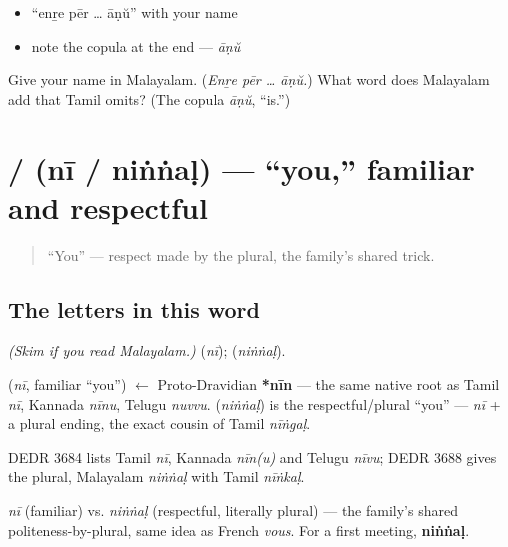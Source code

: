 \begin{itemize}
\raggedright
  \item \textquotedblleft{}enṟe pēr … āṇŭ\textquotedblright{} with your name
  \item note the copula at the end — \emph{āṇŭ}
\end{itemize}

\begin{tcolorbox}[breakable,colback=teal!4,colframe=teal!35!black,title={Before you move on}]
Give your name in Malayalam. (\emph{Enṟe pēr … āṇŭ.}) What word does Malayalam add that Tamil omits? (The copula \emph{āṇŭ}, \textquotedblleft{}is.\textquotedblright{})
\end{tcolorbox}
\section[\texorpdfstring{\ml{നീ} / \ml{നിങ്ങൾ} (nī / niṅṅaḷ)}{നീ / നിങ്ങൾ (nī / niṅṅaḷ)}]{ /  (nī / niṅṅaḷ) — \textquotedblleft{}you,\textquotedblright{} familiar and respectful}

\label{lesson:ML-C02-nii-ningal}



\begin{quote}
\textquotedblleft{}You\textquotedblright{} — respect made by the plural, the family's shared trick.
\end{quote}

\subsection*{The letters in this word}
\emph{(Skim if you read Malayalam.)} \textbf{} (\emph{nī}); \textbf{} (\emph{niṅṅaḷ}).

\begin{cousinweb}
\textbf{} (\emph{nī}, familiar \textquotedblleft{}you\textquotedblright{}) $\leftarrow$ Proto-Dravidian \textbf{*nīn} — the same native root as Tamil \emph{nī}, Kannada \emph{nīnu}, Telugu \emph{nuvvu}. \textbf{} (\emph{niṅṅaḷ}) is the respectful/plural \textquotedblleft{}you\textquotedblright{} — \emph{nī} + a plural ending, the exact cousin of Tamil \emph{nīṅgaḷ}.

DEDR 3684 lists Tamil \emph{nī}, Kannada \emph{nīn(u)} and Telugu \emph{nīvu}; DEDR 3688 gives the plural, Malayalam \emph{niṅṅaḷ} with Tamil \emph{nīṅkaḷ}.
\end{cousinweb}

\begin{grammarlens}[title={Grammar Lens: respect by the plural}]
\emph{nī} (familiar) vs. \emph{niṅṅaḷ} (respectful, literally plural) — the family's shared politeness-by-plural, same idea as French \emph{vous}. For a first meeting, \textbf{niṅṅaḷ}.
\end{grammarlens}

